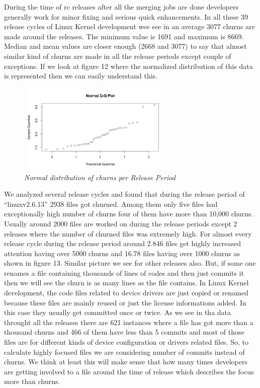 \documentclass{acm_proc_article-sp}
\begin{document}
During the time of rc releases after all the merging jobs are done developers generally work for minor fixing and serious quick enhancements. In all these 39 release cycles of Linux Kernel development wee see in an average 3077 churns are made around the releases. The minimum value is 1691 and maximum is 8669. Median and mean values are closer enough (2668 and 3077) to say that almost similar kind of churns are made in all the release periods except couple of exceptions. If we look at figure 12 where the normalized distribution of this data is represented then we can easily understand this.
\begin{figure}
\begin{center}
\includegraphics[height=1.7in,width=3in]{churnRPnorm.png}
\caption{\small \sl Normal distribution of churns per Release Period}
\end{center}
\end{figure}

We analyzed several release cycles and found that during the release period of ``linuxv2.6.13'' 2938 files got churned. Among them only five files had exceptionally high number of churns four of them have more than 10,000 churns. Usually around 2000 files are worked on during the release periods except 2 releases where the number of churned files was extremely high. For almost every release cycle during the release period around 2.846 files get highly increased attention having over 5000 churns and 16.78 files having over 1000 churns as shown in figure 13. Similar picture we see for other releases also. But, if some one renames a file containing thousands of lines of codes and then just commits it then we will see the churn is as many lines as the file contains. In Linux Kernel development, the code files related to device drivers are just copied or renamed because these files are mainly reused or just the license informations added. In this case they usually get committed once or twice. As we see in tha data throught all the releases there are 621 instances where a file has got more than a thousand churns and 466 of them have less than 5 commits and most of those files are for different kinds of device configuration or drivers related files. So, to calculate highly focused files we are considering number of commits instead of churns. We think at least this will make sense that how many times developers are getting involved to a file around the time of release which describes the focus more than churns.
\end{document}
